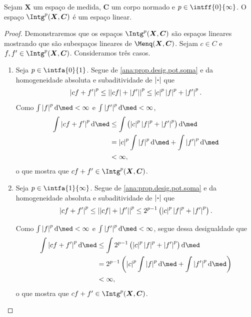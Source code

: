 \begin{prop}
Sejam $\bm X$ um espaço de medida, $\bm C$ um corpo normado e $p \in \intff{0}{\infty}$. O espaço $\Intg^p(\bm X,\bm C)$ é um espaço linear.
\end{prop}
\begin{proof}
Demonstraremos que os espaços $\Intg^p(\bm X,\bm C)$ são espaços lineares mostrando que são subespaços lineares de $\Menq(\bm X,\bm C)$. Sejam $c \in C$ e $f,f' \in \Intg^p(\bm X,\bm C)$. Consideramos três casos.
	\begin{enumerate}
	\item Seja $p \in \intfa{0}{1}$. Segue de \ref{ana:prop.desig.pot.soma} e da homogeneidade absoluta e subaditividade de $\left\vert{\bm{\cdot}}\right\vert$ que
		\begin{equation*}
		\left\vert{cf+f'}\right\vert^p \leq \left\vert{\left\vert{cf}\right\vert+\left\vert{f'}\right\vert}\right\vert^p \leq \left\vert{c}\right\vert^p\left\vert{f}\right\vert^p +  \left\vert{f'}\right\vert^p.
		\end{equation*}
Como $\int \abs{f}^p \dd\med < \infty$ e $\int \abs{f'}^p \dd\med < \infty$,
		\begin{align*}
		\int \abs{cf+f'}^p \dd\med &\leq \int \left( \abs{c}^p\abs{f}^p +  \abs{f'}^p \right) \dd\med \\
			&= \abs{c}^p \int \abs{f}^p \dd\med + \int \abs{f'}^p \dd\med \\
			&< \infty,
		\end{align*}
o que mostra que $cf+f' \in \Intg^p(\bm X,\bm C)$.
	
	\item Seja $p \in \intfa{1}{\infty}$. Segue de \ref{ana:prop.desig.pot.soma} e da homogeneidade absoluta e subaditividade de $\left\vert{\bm{\cdot}}\right\vert$ que
		\begin{equation*}
		\left\vert{cf+f'}\right\vert^p \leq \left\vert{\left\vert{cf}\right\vert+\left\vert{f'}\right\vert}\right\vert^p \leq 2^{p-1}\left( \left\vert{c}\right\vert^p\left\vert{f}\right\vert^p +  \left\vert{f'}\right\vert^p \right).
		\end{equation*}

Como $\int \abs{f}^p \dd\med < \infty$ e $\int \abs{f'}^p \dd\med < \infty$, segue dessa desigualdade que
	\begin{align*}
	\int \abs{cf+f'}^p \dd\med &\leq \int 2^{p-1} \left( \abs{c}^p\abs{f}^p + \abs{f'}^p \right) \dd\med \\
		&= 2^{p-1} \left( \abs{c}^p \int \abs{f}^p \dd\med + \int \abs{f'}^p \dd\med \right) \\
		&< \infty,
	\end{align*}
o que mostra que $cf+f' \in \Intg^p(\bm X,\bm C)$.
	

\end{enumerate}
\end{proof}
